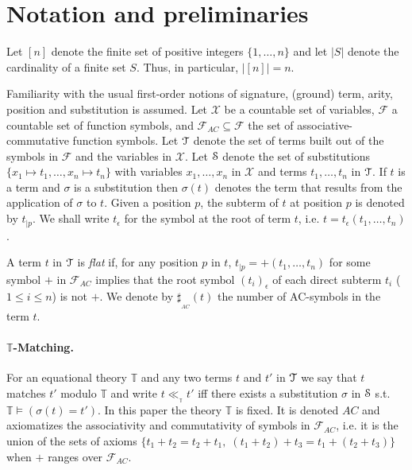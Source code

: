 \documentclass[submission,copyright,creativecommons]{eptcs}
\newcommand \matchth[3]{#1 {\ll}_{{ }_{#3}} {#2}}
\newcommand \numberAC[1]{\sharp_{{}_{AC}}{(#1)}}
\numberwithin{subcase}{case}
\begin{document}
\section{Notation and preliminaries}
\label{Notations:Sec}
Let $[n]$ denote the finite set of
positive integers $\{1,\ldots,n\}$ and let $|S|$ denote the cardinality of
a finite set $S$.  Thus, in particular, $|[n]| = n$.

Familiarity with the usual first-order notions of signature, (ground) term,
arity, position and substitution is assumed. Let $\mathcal{X}$ be a countable set
of variables, $\mathcal{F}$ a countable set of function symbols, and
$\mathcal{F}_{AC} \subseteq \mathcal{F}$ the set of associative-commutative
function symbols. Let $\EuScript{T}$
denote the set of terms built out of the symbols in $\mathcal{F}$ and the
variables in $\mathcal{X}$. Let $\EuScript{S}$ denote the set of substitutions
$\{x_1\mapsto t_1,\ldots,x_n\mapsto t_n\}$ with variables $x_1, \ldots, x_n$ in
$\mathcal{X}$ and terms $t_1, \ldots, t_n$ in $\EuScript{T}$. If $t$ is a term
and $\sigma$ is a
 substitution then $\sigma(t)$ denotes the term that results from the application
 of $\sigma$ to $t$. Given a position $p$, the subterm of $t$ at position
 $p$ is denoted by $t_{\mid p}$. We shall write $t_{\epsilon}$ for the
 symbol at the root of term $t$, i.e. $t=t_{\epsilon}(t_1,\ldots,t_n)$.

A term $t$ in $\EuScript{T}$ is \emph{flat} if, for any
position $p$ in $t$, $t_{\mid p} = +(t_1, \ldots, t_n)$ for some symbol $+$ in
$\mathcal{F}_{AC}$ implies that the root symbol ${(t_{i})}_{\epsilon}$ of each
direct subterm $t_{i}$ ($1 \leq i \leq n$) is not $+$. We denote  by
$\numberAC{t}$ the number of AC-symbols in the term $t$.

\paragraph{$\mathbb{T}$-Matching.}
For an equational theory $\mathbb{T}$ and any two terms $t$ and $t'$  in
$\EuScript{T}$ we say that $t$ matches $t'$ modulo $\mathbb{T}$ and write
$\matchth{t}{t'}{\mathbb{T}}$ iff there exists a substitution $\sigma$ in
$\EuScript{S}$ s.t. $\mathbb{T}\models (\sigma(t) =t')$. In this paper the theory
$\mathbb{T}$ is fixed. It is denoted $AC$ and axiomatizes the associativity and
commutativity of symbols in $\mathcal{F}_{AC}$,
i.e. it is the union of the sets of axioms $\{t_1+t_2=t_2+t_1,\;
(t_1+t_2)+t_3=t_1+(t_2+t_3)\}$
when $+$ ranges over $\mathcal{F}_{AC}$.  
\end{document}
